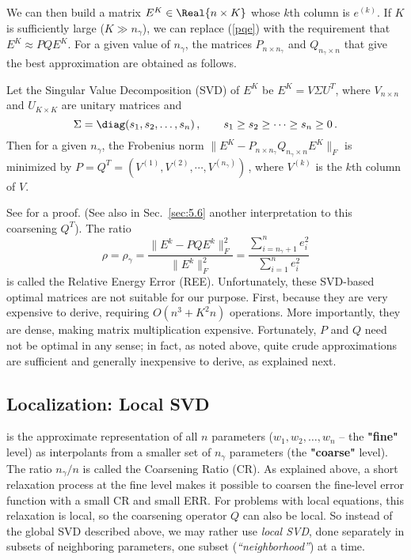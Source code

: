\documentclass{article} %
\begin{document}
We can then build a matrix $E^K \in \Real {n \times K}$ whose $k$th column is $e^{(k)}$. If $K$ is sufficiently large ($K \gg n_{\gamma}$), we can replace (\ref{pqe}) with the requirement that $E^K \approx P Q E^K$. For a given value of $n_{\gamma}$, the matrices $P_{n \times n_{\gamma}}$ and $Q_{n_{\gamma} \times n}$ that give the best approximation are obtained as follows.

\begin{theorem}
Let the Singular Value Decomposition (SVD) of $E^K$ be $E^K = V \Sigma U^T$, where $V_{n \times n}$ and $U_{K \times K}$ are unitary matrices and 
$$
	\Sigma = \diag(s_1, s_2, \dots, s_n)\,,\qquad s_1 \geq s_2 \geq \cdots \geq s_n \geq 0\,.
$$
Then for a given $n_{\gamma}$, the Frobenius norm $\|E^K - P_{n \times n_{\gamma}} Q_{n_{\gamma} \times n} E^K\|_F$ is minimized by $P = Q^T = (V^{(1)}, V^{(2)}, \cdots, V^{(n_{\gamma})})$\,, where $V^{(k)}$ is the $k$th column of $V$.
\end{theorem}

See \cite{eym} for a proof. (See also in Sec.~\ref{sec:5.6} another interpretation to this coarsening $Q^T$). The ratio
\begin{equation}
    \rho = \rho_{\gamma} = \frac{\|E^k - P Q E^k \|^2_F}{\|E^k\|^2_F} =
    \frac{\sum_{i=n_{\gamma}+1}^n e_i^2}{\sum_{i=1}^n e_i^2}
    \label{ree}
\end{equation}
is called the Relative Energy Error (REE). Unfortunately, these SVD-based optimal matrices are not suitable for our purpose. First, because they are very expensive to derive, requiring $O(n^3 + K^2 n)$ operations. More importantly, they are dense, making matrix multiplication expensive. Fortunately, $P$ and $Q$ need not be optimal in any sense; in fact, as noted above, quite crude approximations are sufficient and generally inexpensive to derive, as explained next.

\subsection{Localization: Local SVD}
\label{sec:neighborhoods}
 is the approximate representation of all $n$ parameters ($w_1, w_2, \dots, w_n$ -- the \textbf{"fine"} level) as interpolants from a smaller set of $n_{\gamma}$ parameters (the \textbf{"coarse"} level). The ratio $n_{\gamma}/n$ is called the Coarsening Ratio (CR). As explained above, a short relaxation process at the fine level makes it possible to coarsen the fine-level error function with a small CR and small ERR. For problems with local equations, this relaxation is local, so the coarsening operator $Q$ can also be local. So instead of the global SVD described above, we may rather use {\it local SVD}, done separately in subsets of neighboring parameters, one subset ({\it ``neighborhood''}) at a time.
\end{document}
